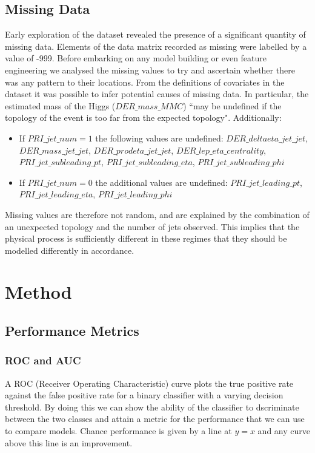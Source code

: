 \subsection{Missing Data}
Early exploration of the dataset revealed the presence of a significant quantity of missing data. Elements of the data matrix recorded as missing were labelled by a value of -999. Before embarking on any model building or even feature engineering we analysed the missing values to try and ascertain whether there was any pattern to their locations. From the definitions of covariates in the dataset it was possible to infer potential causes of missing data. In particular, the estimated mass of the Higgs ($DER\_mass\_MMC$) ``may be undefined if the topology of the event is too far from the expected topology". Additionally:
\begin{itemize}
	\item If $PRI\_jet\_num = 1$ the following values are undefined:
	$DER\_deltaeta\_jet\_jet$, $DER\_mass\_jet\_jet$, $DER\_prodeta\_jet\_jet$, $DER\_lep\_eta\_centrality$, $PRI\_jet\_subleading\_pt$, $PRI\_jet\_subleading\_eta$, $PRI\_jet\_subleading\_phi$
    \item If $PRI\_jet\_num = 0$ the additional values are undefined: 
    $PRI\_jet\_leading\_pt$, $PRI\_jet\_leading\_eta$, $PRI\_jet\_leading\_phi$
\end{itemize}

Missing values are therefore not random, and are explained by the combination of an unexpected topology and the number of jets observed. This implies that the physical process is sufficiently different in these regimes that they should be modelled differently in accordance. 

\section{Method}
\label{method}

\subsection{Performance Metrics}

\subsubsection{ROC and AUC}
A ROC (Receiver Operating Characteristic) curve plots the true positive rate against the false positive rate for a binary classifier with a varying decision threshold. By doing this we can show the ability of the classifier to dscriminate between the two classes and attain a metric for the performance that we can use to compare models. Chance performance is given by a line at $y=x$ and any curve above this line is an improvement. 

